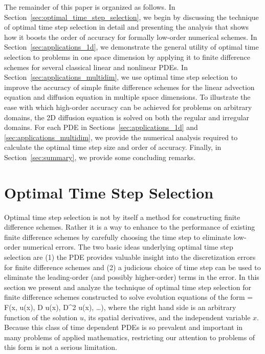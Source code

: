 \documentclass[oneeqnum,onefignum,onetabnum,onethmnum]{siamltex}
\begin{document}
The remainder of this paper is organized as follows.  
In Section~\ref{sec:optimal_time_step_selection}, we begin by 
discussing the technique of optimal time step selection in detail and 
presenting the analysis that shows how it boosts the order of accuracy 
for formally low-order numerical schemes.  In 
Section~\ref{sec:applications_1d}, we demonstrate the general utility of 
optimal time selection to problems in one space dimension by applying it to 
finite difference schemes for several classical linear and nonlinear PDEs. 
In Section~\ref{sec:applications_multidim}, we use optimal time step selection 
to improve the accuracy of simple finite difference schemes for the linear 
advection equation and diffusion equation in multiple space dimensions.  
To illustrate the ease with which high-order accuracy can be achieved for
problems on arbitrary domains, the 2D diffusion equation is solved on both 
the regular and irregular domains.  
For each PDE in Sections~\ref{sec:applications_1d} and 
\ref{sec:applications_multidim}, we provide the numerical analysis required 
to calculate the optimal time step size and order of accuracy.  
Finally, in Section~\ref{sec:summary}, we provide some concluding remarks. 


\section{\label{sec:optimal_time_step_selection} 
         Optimal Time Step Selection}
Optimal time step selection is not by itself a method for constructing 
finite difference schemes.  Rather it is a way to enhance to the performance
of existing finite difference schemes by carefully choosing the time step to 
eliminate low-order numerical errors.  The two basic ideas underlying 
optimal time step selection are (1) the PDE provides valuable insight into the 
discretization errors for finite difference schemes and (2) a judicious choice 
of time step can be used to eliminate the leading-order (and possibly 
higher-order) terms in the error.  In this section we present and analyze the 
technique of optimal time step selection for finite difference schemes 
constructed to solve evolution equations of the form 
\beq
   = 
    F\left(x, u(x), D u(x), D^2 u(x), \ldots \right), 
\eeq
where the right hand side is an arbitrary function of the solution $u$, its 
spatial derivatives, and the independent variable $x$.
Because this class of time dependent PDEs is so prevalent and important in 
many problems of applied mathematics, restricting our attention to problems 
of this form is not a serious limitation.  
\end{document}
